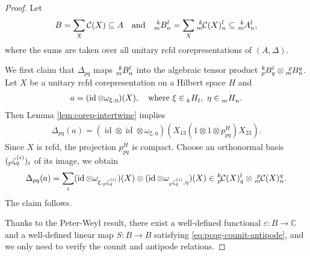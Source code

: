 \documentclass[11pt]{article}
\DeclareMathOperator{\id}{id}
\newcommand{\C}{\mathbb{C}}
\newcommand{\Gr}[5]{\tensor*[^{#2}_{#4}]{#1}{^{#3}_{#5}}}%
\newcommand{\Grd}[3]{\Gr{#1}{}{}{#2}{#3}}
\theoremstyle{definition}
\numberwithin{equation}{section}
\begin{document}
\begin{proof}
  Let
  \begin{align*}
    B = \sum_{X} \mathcal{C}(X) \subseteq A \quad \text{and} \quad \Gr{B}{k}{l}{m}{n} = \sum_{X}
    \Gr{\mathcal{C}(X)}{k}{l}{m}{n} \subseteq \Gr{A}{k}{l}{m}{n},
  \end{align*}
  where the sums are taken over all unitary rcfd corepresentations of $(A,\Delta)$.

  We first claim that $\Delta_{pq}$ maps $\Gr{B}{k}{l}{m}{n}$ into the algebraic tensor product
  $\Gr{B}{k}{l}{p}{q} \otimes \Gr{B}{p}{q}{m}{n}$.  Let $X$ be a unitary rcfd corepresentation on a
  Hilbert space $H$ and
  \begin{align*}
    a = (\id\otimes
  \omega_{\xi,\eta})(X), \quad \text{where } \xi \in \Grd{H}{k}{l}, \ \eta\in \Grd{H}{m}{n}.
  \end{align*}
 Then Lemma \ref{lem:corep-intertwine} implies
  \begin{align*}
    \Delta_{pq}(a) = (\id \otimes \id \otimes \omega_{\xi,\eta})(X_{13}(1\otimes 1 \otimes p^{H}_{pq})X_{23}).
  \end{align*}
  Since $X$ is rcfd,  the projection $p^{H}_{pq}$ is compact. Choose an orthonormal
  basis $(\Gr{\zeta}{}{(i)}{p}{q})_{i}$ of its image, we obtain
  \begin{align*}
    \Delta_{pq}(a) = \sum_{i} (\id \otimes \omega_{\xi,\Gr{\zeta}{}{(i)}{p}{q}})(X) \otimes (\id \otimes
    \omega_{\Gr{\zeta}{}{(i)}{p}{q},\eta})(X) \in \Gr{\mathcal{C}(X)}{k}{l}{p}{q} \otimes \Gr{\mathcal{C}(X)}{p}{q}{m}{n}.
  \end{align*}
  The claim follows.
  
  Thanks to the Peter-Weyl result, there exist a well-defined functional $\varepsilon \colon B\to
  \C$ and a well-defined linear map $S\colon B\to B$ satisfying \eqref{eq:pcqg-counit-antipode}, and
  we only need to verify the counit and antipode relations.  


\end{proof}
\end{document}
